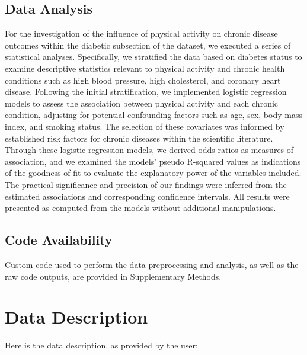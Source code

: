 \documentclass[11pt]{article}
\begin{document}
\subsection*{Data Analysis}
For the investigation of the influence of physical activity on chronic disease outcomes within the diabetic subsection of the dataset, we executed a series of statistical analyses. Specifically, we stratified the data based on diabetes status to examine descriptive statistics relevant to physical activity and chronic health conditions such as high blood pressure, high cholesterol, and coronary heart disease. Following the initial stratification, we implemented logistic regression models to assess the association between physical activity and each chronic condition, adjusting for potential confounding factors such as age, sex, body mass index, and smoking status. The selection of these covariates was informed by established risk factors for chronic diseases within the scientific literature. Through these logistic regression models, we derived odds ratios as measures of association, and we examined the models' pseudo R-squared values as indications of the goodness of fit to evaluate the explanatory power of the variables included. The practical significance and precision of our findings were inferred from the estimated associations and corresponding confidence intervals. All results were presented as computed from the models without additional manipulations.\subsection*{Code Availability}

Custom code used to perform the data preprocessing and analysis, as well as the raw code outputs, are provided in Supplementary Methods.






\clearpage
\appendix

\section{Data Description} \label{sec:data_description} Here is the data description, as provided by the user:
\end{document}
